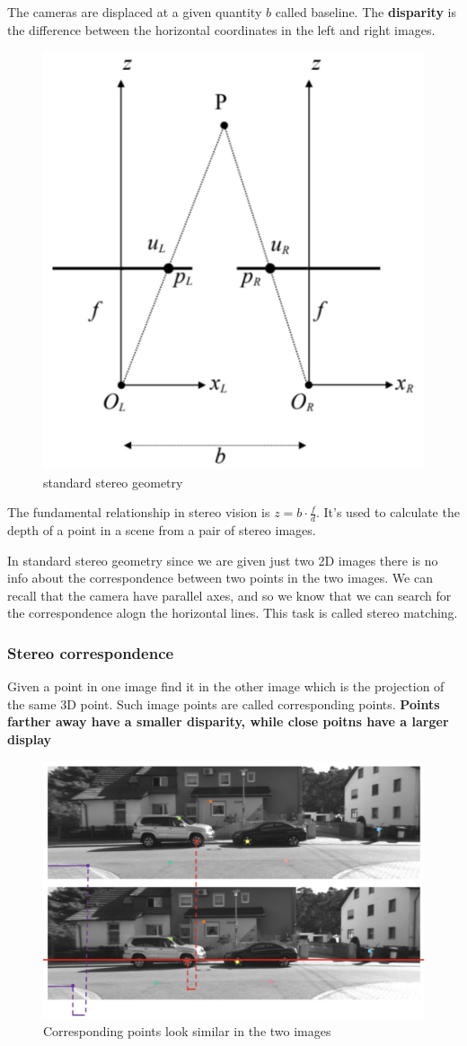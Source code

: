 \documentclass{article}
\begin{document}
The cameras are displaced at a given quantity $b$ called baseline.
The \textbf{disparity} is the difference between the horizontal coordinates in the left and right images.

\begin{figure}[htbp]
  \centering
  \includegraphics[width=0.45\linewidth]{./img/standard_stereo_geometry.jpg}
  \caption{standard stereo geometry}
  \label{fig:standard_stereo_geometry}
\end{figure}

The fundamental relationship in stereo vision is $z = b \cdot \frac{f}{d}$.
It's used to calculate the depth of a point in a scene from a pair of stereo images.

In standard stereo geometry since we are given just two 2D images there is no info about the correspondence between two points in the two images.
We can recall that the camera have parallel axes, and so we know that we can search for the correspondence alogn the horizontal lines.
This task is called stereo matching.

\subsubsection{Stereo correspondence}
Given a point in one image find it in the other image which is the projection of the same 3D point.
Such image points are called corresponding points.
\textbf{Points farther away have a smaller disparity, while close poitns have a larger display}

\begin{figure}[htbp]
  \centering
  \includegraphics[width=0.65\linewidth]{./img/stereo_correspondence.jpg}
  \caption{Corresponding points look similar in the two images}
  \label{fig:stereo_correspondence}
\end{figure}
\end{document}
